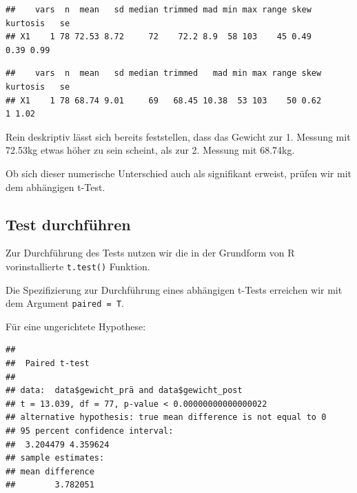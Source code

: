 \documentclass[
]{book}
\newenvironment{Shaded}{\begin{snugshade}}{\end{snugshade}}
\newcommand{\AttributeTok}[1]{\textcolor[rgb]{0.13,0.29,0.53}{#1}}
\newcommand{\FunctionTok}[1]{\textcolor[rgb]{0.13,0.29,0.53}{\textbf{#1}}}
\newcommand{\NormalTok}[1]{#1}
\newcommand{\SpecialCharTok}[1]{\textcolor[rgb]{0.81,0.36,0.00}{\textbf{#1}}}
\begin{document}
\begin{verbatim}
##    vars  n  mean   sd median trimmed mad min max range skew kurtosis   se
## X1    1 78 72.53 8.72     72    72.2 8.9  58 103    45 0.49     0.39 0.99
\end{verbatim}

\begin{Shaded}
\end{Shaded}

\begin{verbatim}
##    vars  n  mean   sd median trimmed   mad min max range skew kurtosis   se
## X1    1 78 68.74 9.01     69   68.45 10.38  53 103    50 0.62        1 1.02
\end{verbatim}

Rein deskriptiv lässt sich bereits feststellen, dass das Gewicht zur 1. Messung mit 72.53kg etwas höher zu sein scheint, als zur 2. Messung mit 68.74kg.

Ob sich dieser numerische Unterschied auch als signifikant erweist, prüfen wir mit dem abhängigen t-Test.

\subsection{Test durchführen}\label{test-durchfuxfchren-2}

Zur Durchführung des Tests nutzen wir die in der Grundform von R vorinstallierte \texttt{t.test()} Funktion.

Die Spezifizierung zur Durchführung eines abhängigen t-Tests erreichen wir mit dem Argument \texttt{paired\ =\ T}.

Für eine ungerichtete Hypothese:

\begin{Shaded}
\end{Shaded}

\begin{verbatim}
## 
##  Paired t-test
## 
## data:  data$gewicht_prä and data$gewicht_post
## t = 13.039, df = 77, p-value < 0.00000000000000022
## alternative hypothesis: true mean difference is not equal to 0
## 95 percent confidence interval:
##  3.204479 4.359624
## sample estimates:
## mean difference 
##        3.782051
\end{verbatim}
\end{document}
